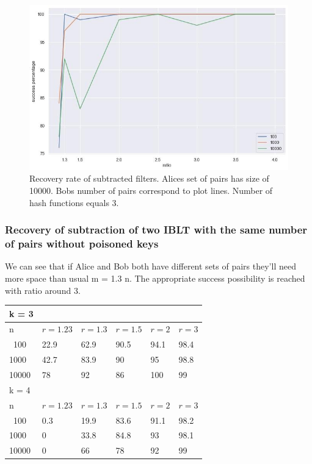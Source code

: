 \documentclass{article}
\begin{document}
\begin{figure}[h]
\centering
\includegraphics[scale=1.3]{./different_sizes.jpg}
\caption{Recovery rate of subtracted filters. Alices set of pairs has size of 
10000. Bobs number of pairs correspond to plot lines. Number of hash functions equals 3.}  

\end{figure}


\subsubsection{Recovery of subtraction of two IBLT with the same number of pairs without poisoned keys}

We can see that if Alice and Bob both have different sets of pairs they'll need 
more space than usual m = 1.3 n. The appropriate success possibility is reached 
with ratio around 3.
\begin{center}
\begin{tabular}{l | l | l | l | l | l} \hline \hline k = 3 \\ \hline
    \hline n & $r = 1.23$ &  $r = 1.3$  &  $r = 1.5$ & $r = 2$ & $r = 3$\\ \hline
    \hline \ 100 & 22.9 & 62.9 & 90.5 & 94.1 & 98.4 \\ \hline 
    1000 & 42.7 & 83.9 & 90 & 95 & 98.8 \\ \hline
    10000 & 78 & 92 & 86 & 100 & 99 \\ \hline
    \hline
    k = 4 \\
    \hline
    \hline n & $r = 1.23$ &  $r = 1.3$  &  $r = 1.5$ & $r = 2$ & $r = 3$\\ \hline
    \hline \ 100 & 0.3 & 19.9 & 83.6 & 91.1 & 98.2 \\ \hline 
    1000 & 0 & 33.8 & 84.8 & 93 & 98.1 \\ \hline
    10000 & 0 & 66 & 78 & 92 & 99 \\ \hline
\end{tabular}
\end{center}
\end{document}
